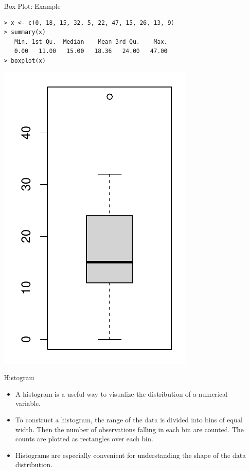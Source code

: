 \documentclass{beamer}
\begin{document}
\begin{frame}[fragile]{Box Plot: Example}
\small
\begin{verbatim}
> x <- c(0, 18, 15, 32, 5, 22, 47, 15, 26, 13, 9)
> summary(x)
   Min. 1st Qu.  Median    Mean 3rd Qu.    Max. 
   0.00   11.00   15.00   18.36   24.00   47.00 
> boxplot(x)
\end{verbatim}
\normalsize
\includegraphics[scale=0.4]{figure/boxplot1.pdf}
\end{frame}

\begin{frame}[fragile]{Histogram}
\begin{itemize}
\item A histogram is a useful way to visualize the distribution of a numerical variable.  
\vspace{10pt}
\item To construct a histogram, the range of the data is divided into bins of equal width.  Then the number of observations falling in each bin are counted.  The counts are plotted as rectangles over each bin.
\vspace{10pt}
\item Histograms are especially convenient for understanding the shape of the data distribution.
\end{itemize}
\end{frame}
\end{document}
